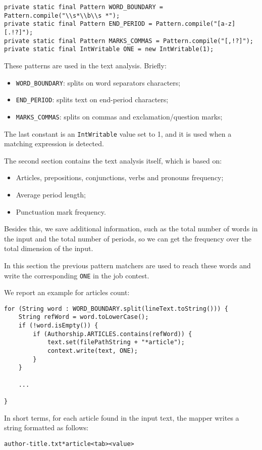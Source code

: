 \documentclass[a4paper,11pt, twoside]{article}
\begin{document}
	\begin{lstlisting}[firstnumber=73, caption={Declaration of Regular Expression Patterns}, captionpos=b]
private static final Pattern WORD_BOUNDARY = Pattern.compile("\\s*\\b\\s *");
private static final Pattern END_PERIOD = Pattern.compile("[a-z][.!?]");
private static final Pattern MARKS_COMMAS = Pattern.compile("[,!?]");
private static final IntWritable ONE = new IntWritable(1);
	\end{lstlisting}
	
		\noindent
		These patterns are used in the text analysis. Briefly: 
		\begin{itemize}
			\item \lstinline|WORD_BOUNDARY|: splits on word separators characters;
			\item \lstinline|END_PERIOD|: splits text on end-period characters;
			\item \lstinline|MARKS_COMMAS|: splits on commas and exclamation/question marks;
		\end{itemize}

	\noindent
	The last constant is an \lstinline|IntWritable| value set to 1, and it is used when a matching expression is detected.

	\noindent
	The second section contains the text analysis itself, which is based on: \begin{itemize}
		\item Articles, prepositions, conjunctions, verbs and pronouns frequency;
		\item Average period length;
		\item Punctuation mark frequency.
	\end{itemize}
	Besides this, we save additional information, such as the total number of words in the input and the total number of periods, so we can get the frequency over the total dimension of the input.

	\noindent
	In this section the previous pattern matchers are used to reach these words and write the corresponding \lstinline|ONE| in the job contest. 
	
	\noindent
	We report an example for articles count: \begin{lstlisting}[firstnumber=85, caption={Articles counting in Map method}, captionpos=b]
for (String word : WORD_BOUNDARY.split(lineText.toString())) {
	String refWord = word.toLowerCase();
	if (!word.isEmpty()) {
		if (Authorship.ARTICLES.contains(refWord)) {
			text.set(filePathString + "*article");
			context.write(text, ONE);
		}
	}

	...

}
	\end{lstlisting}
	\noindent
	In short terms, for each article found in the input text, the mapper writes a string formatted as follows:\begin{center}
		\texttt{author-title.txt*article<tab><value>} 
	\end{center}
\end{document}

